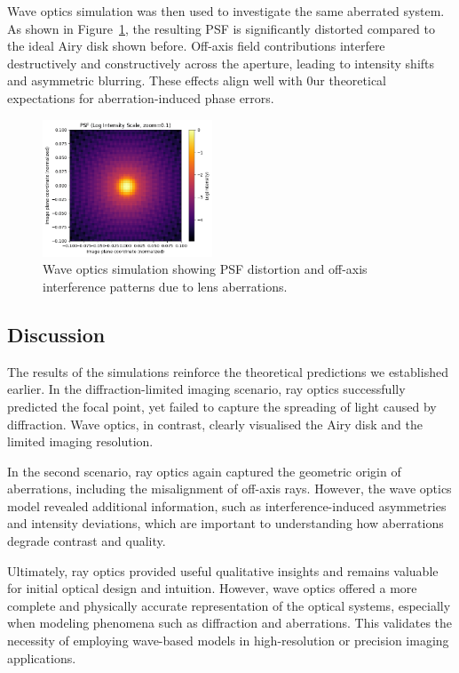 \begin{multicols}{2}
Wave optics simulation was then used to investigate the same aberrated system.
As shown in Figure~\ref{fig:wave-aberration}, the resulting PSF is significantly distorted compared to the ideal Airy disk shown before.
Off-axis field contributions interfere destructively and constructively across the aperture, leading to intensity shifts
and asymmetric blurring. These effects align well with 0ur theoretical expectations for aberration-induced phase errors.

\begin{figure}[H]
    \centering
    \includegraphics[width=0.45\textwidth]{../images/wave_optics_aberration.png}
    \caption{Wave optics simulation showing PSF distortion and off-axis interference patterns due to lens aberrations.}
    \label{fig:wave-aberration}
\end{figure}

\subsection{Discussion}

The results of the simulations reinforce the theoretical predictions we established earlier.
In the diffraction-limited imaging scenario, ray optics successfully predicted the focal point, yet failed to capture
the spreading of light caused by diffraction. Wave optics, in contrast, clearly visualised the Airy disk and the limited imaging resolution.

In the second scenario, ray optics again captured the geometric origin of aberrations, including the misalignment of
off-axis rays. However, the wave optics model revealed additional information, such as interference-induced
asymmetries and intensity deviations, which are important to understanding how aberrations degrade contrast and quality.

Ultimately, ray optics provided useful qualitative insights and remains valuable for initial optical design and intuition.
However, wave optics offered a more complete and physically accurate representation of the optical systems, especially
when modeling phenomena such as diffraction and aberrations. This validates the necessity of employing wave-based models
in high-resolution or precision imaging applications.
\end{multicols}